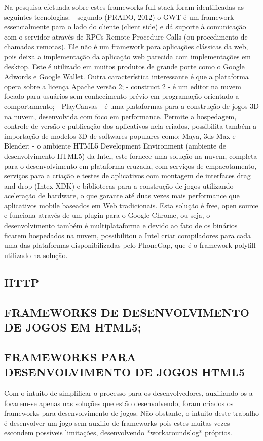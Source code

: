 \documentclass[11pt,a4paper]{article}
\begin{document}
Na pesquisa efetuada sobre estes frameworks full stack foram identificadas as seguintes tecnologias:
    - segundo (PRADO, 2012) o GWT é um framework essencialmente para o lado do cliente (client side) e dá suporte à comunicação com o servidor através de RPCs Remote Procedure Calls (ou procedimento de chamadas remotas). Ele não é um framework para aplicações clássicas da web, pois deixa a implementação da aplicação web parecida com implementações em desktop. Este é utilizado em muitos produtos de grande porte como o Google Adwords e Google Wallet. Outra característica interessante é que a plataforma opera sobre a licença Apache versão 2;
    - construct 2 -  é um editor na nuvem focado para usuários sem conhecimento prévio em programação orientado a comportamento;
    - PlayCanvas - é uma plataformas para a construção de jogos 3D na nuvem, desenvolvida com foco em performance. Permite a hospedagem, controle de versão e publicação dos aplicativos nela criados, possibilita também a importação de modelos 3D de softwares populares como: Maya, 3ds Max e Blender;
    - o ambiente HTML5 Development Environment (ambiente de desenvolvimento HTML5) da Intel, este fornece uma solução na nuvem, completa para o desenvolvimento em plataforma cruzada, com serviços de empacotamento, serviços para a criação e testes de aplicativos com montagem de interfaces drag and drop (Intex XDK) e bibliotecas para a construção de jogos utilizando aceleração de hardware, o que garante até duas vezes mais performance que aplicativos mobile baseados em Web tradicionais. Esta solução é free, open source e funciona através de um plugin para o Google Chrome, ou seja, o desenvolvimento também é multiplataforma e devido ao fato de os binários ficarem hospedados na nuvem, possibilitou a Intel criar compiladores para cada uma das plataformas disponibilizadas pelo PhoneGap, que é o framework polyfill utilizado na solução.

\subsection{ HTTP}

\subsection{FRAMEWORKS DE DESENVOLVIMENTO DE JOGOS EM HTML5;}


\subsection{ FRAMEWORKS PARA DESENVOLVIMENTO DE JOGOS HTML5}
Com o intuito de simplificar o processo para os desenvolvedores, auxiliando-os a focarem-se apenas nas soluções que estão desenvolvendo, foram criados os frameworks para desenvolvimento de jogos. Não obstante, o intuito deste trabalho é desenvolver um jogo sem auxilio de frameworks pois estes muitas vezes escondem possíveis limitações, desenvolvendo *workaroundslog* próprios.
\end{document}
